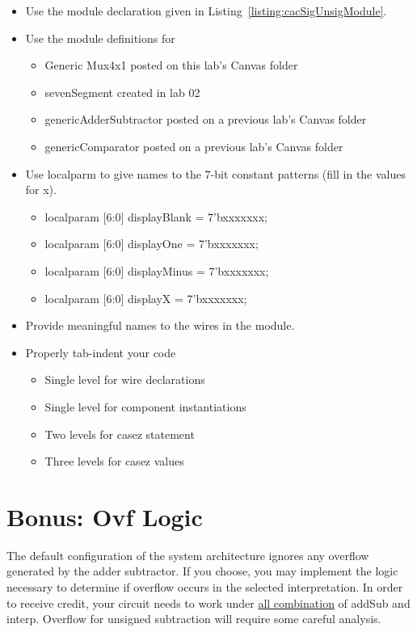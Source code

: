 \begin{itemize}
\item
  Use the module declaration given in Listing~\ref{listing:cacSigUnsigModule}.
\item
  Use the module definitions for

  \begin{itemize}
  \item
    Generic Mux4x1 posted on this lab's Canvas folder
  \item
    sevenSegment created in lab 02
  \item
    genericAdderSubtractor posted on a previous lab's Canvas folder
  \item
    genericComparator posted on a previous lab's Canvas folder
  \end{itemize}
\item
  Use localparm to give names to the 7-bit constant patterns (fill in
  the values for x).

  \begin{itemize}
  \item
    localparam {[}6:0{]} displayBlank = 7'bxxxxxxx;
  \item
    localparam {[}6:0{]} displayOne = 7'bxxxxxxx;
  \item
    localparam {[}6:0{]} displayMinus = 7'bxxxxxxx;
  \item
    localparam {[}6:0{]} displayX = 7'bxxxxxxx;
  \end{itemize}
\item
  Provide meaningful names to the wires in the module.
\item
  Properly tab-indent your code

  \begin{itemize}
  \item
    Single level for wire declarations
  \item
    Single level for component instantiations
  \item
    Two levels for casez statement
  \item
    Three levels for casez values
  \end{itemize}
\end{itemize}

\section{Bonus: Ovf Logic}

The default configuration of the system architecture ignores any
overflow generated by the adder subtractor. If you choose, you may
implement the logic necessary to determine if overflow occurs in the
selected interpretation. In order to receive credit, your circuit needs
to work under \uline{all combination} of addSub and interp. Overflow for
unsigned subtraction will require some careful analysis.

